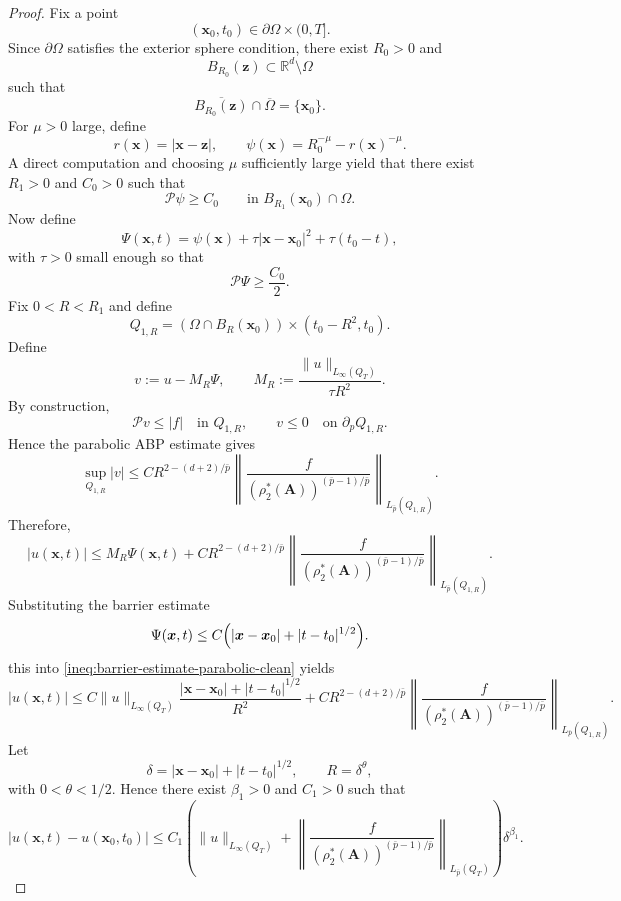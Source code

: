 \documentclass[final,onefignum,onetabnum]{mousaviart}
\begin{document}
\begin{proof}
		Fix a point
		\[
		(\boldsymbol{x}_0,t_0)\in \partial\Omega\times(0,T].
		\]
		Since \(\partial\Omega\) satisfies the exterior sphere condition, there exist \(R_0>0\) and
		\[
		B_{R_0}(\boldsymbol{z})\subset \mathbb{R}^d\setminus\Omega
		\]
		such that
		\[
		\overline{B_{R_0}(\boldsymbol{z})}\cap\overline{\Omega}
		=
		\{\boldsymbol{x}_0\}.
		\]
		For $\mu>0$ large, define
		\[
		r(\boldsymbol{x}) = |\boldsymbol{x}-\boldsymbol{z}|,
		\qquad
		\psi(\boldsymbol{x})
		=
		R_0^{-\mu}-r(\boldsymbol{x})^{-\mu}.
		\]
		A direct computation and choosing $\mu$ sufficiently large yield that there exist \(R_1>0\) and \(C_0>0\) such that
		\begin{equation}
			\label{ineq:positive-operator-value-clean}
			\mathcal{P}\psi\ge C_0
			\qquad
			\text{in } B_{R_1}(\boldsymbol{x}_0)\cap\Omega.
		\end{equation}
		Now define
		\[
		\Psi(\boldsymbol{x},t)
		=
		\psi(\boldsymbol{x})
		+
		\tau |\boldsymbol{x}-\boldsymbol{x}_0|^2
		+
		\tau (t_0-t),
		\]
		with \(\tau>0\) small enough so that
		\[
		\mathcal{P} \Psi \ge \frac{C_0}{2}.
		\]
		Fix \(0<R<R_1\) and define
		\[
		Q_{1,R}
		=
		(\Omega\cap B_R(\boldsymbol{x}_0))
		\times
		(t_0-R^2,t_0).
		\]
		Define
		\[
		v:=u-M_R\Psi,
		\qquad
		M_R
		:=
		\frac{\|u\|_{L_\infty(Q_T)}}{\tau R^2}.
		\]
		By construction,
		\[
		\mathcal{P} v \leq \left| f \right| 
		\quad
		\text{in }Q_{1,R},
		\qquad
		v \leq 0
		\quad
		\text{on } \partial_{p}Q_{1,R}.
		\]
		Hence the parabolic ABP estimate gives
		\[
		\sup_{Q_{1,R}} \left| v \right| 
		\le
		C R^{2-(d+2)/\bar p}
		\left\|
		\frac{f}{(\rho_2^\ast(\boldsymbol{A}))^{(\bar p-1)/\bar p}}
		\right\|_{L_{\bar p}(Q_{1,R})}.
		\]
		Therefore,
		\begin{equation}
			\label{ineq:barrier-estimate-parabolic-clean}
			|u(\boldsymbol{x},t)|
			\le
			M_R\Psi(\boldsymbol{x},t)
			+
			C R^{2-(d+2)/\bar p}
			\left\|
			\frac{f}{(\rho_2^\ast(\boldsymbol{A}))^{(\bar p-1)/\bar p}}
			\right\|_{L_{\bar p}(Q_{1,R})}.
		\end{equation}
		Substituting the barrier estimate
		\[
		\Psi(\boldsymbol{x},t)
		\le
		C\Bigl(
		|\boldsymbol{x}-\boldsymbol{x}_0|
		+
		|t-t_0|^{1/2}
		\Bigr).
		\]
		this into \eqref{ineq:barrier-estimate-parabolic-clean} yields
		\[
		|u(\boldsymbol{x},t)|
		\le
		C
		\|u\|_{L_\infty(Q_T)}
		\frac{
			|\boldsymbol{x}-\boldsymbol{x}_0|
			+
			|t-t_0|^{1/2}
		}{R^2}
		+
		C
		R^{2-(d+2)/\bar p}
		\left\|
		\frac{f}{(\rho_2^\ast(\boldsymbol{A}))^{(\bar p-1)/\bar p}}
		\right\|_{L_{\bar p}(Q_{1,R})}.
		\]
		Let
		\[
		\delta
		=
		|\boldsymbol{x}-\boldsymbol{x}_0|
		+
		|t-t_0|^{1/2},
		\qquad
		R=\delta^\theta,
		\]
		with \(0<\theta<1/2\). Hence there exist \(\beta_1>0\) and \(C_1>0\) such that
		\begin{equation}
			\label{ineq:lateral-holder}
			|u(\boldsymbol{x},t)-u(\boldsymbol{x}_0,t_0)|
			\le
			C_1
			\left(
			\|u\|_{L_\infty(Q_T)}
			+
			\left\|
			\frac{f}{(\rho_2^\ast(\boldsymbol{A}))^{(\bar p-1)/\bar p}}
			\right\|_{L_{\bar p}(Q_T)}
			\right)
			\delta^{\beta_1}.
		\end{equation}
		

\end{proof}
\end{document}
